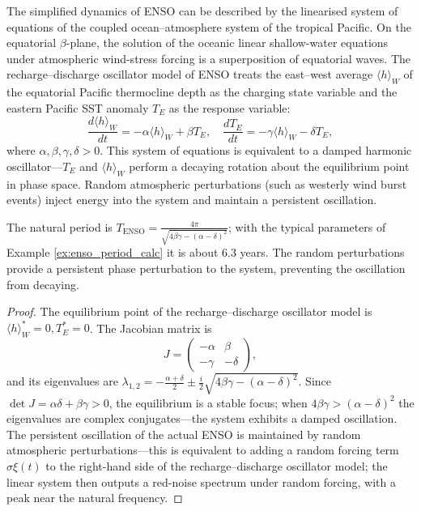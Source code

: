 \begin{proposition}\label{prop:enso_oscillator}
The simplified dynamics of ENSO can be described by the linearised system of equations of the coupled ocean--atmosphere system of the tropical Pacific. On the equatorial $\beta$-plane, the solution of the oceanic linear shallow-water equations under atmospheric wind-stress forcing is a superposition of equatorial waves. The recharge--discharge oscillator model of ENSO treats the east--west average $\langle h \rangle_W$ of the equatorial Pacific thermocline depth as the charging state variable and the eastern Pacific SST anomaly $T_E$ as the response variable:
\[
\frac{d\langle h \rangle_W}{dt} = -\alpha \langle h \rangle_W + \beta T_E, \quad \frac{dT_E}{dt} = -\gamma \langle h \rangle_W - \delta T_E,
\]
where $\alpha, \beta, \gamma, \delta > 0$. This system of equations is equivalent to a damped harmonic oscillator---$T_E$ and $\langle h \rangle_W$ perform a decaying rotation about the equilibrium point in phase space. Random atmospheric perturbations (such as westerly wind burst events) inject energy into the system and maintain a persistent oscillation.

The natural period is $T_{\text{ENSO}} = \frac{4\pi}{\sqrt{4\beta\gamma - (\alpha-\delta)^2}}$; with the typical parameters of Example \ref{ex:enso_period_calc} it is about $6.3$ years. The random perturbations provide a persistent phase perturbation to the system, preventing the oscillation from decaying.
\end{proposition}

\begin{proof}
The equilibrium point of the recharge--discharge oscillator model is $\langle h \rangle_W^* = 0, T_E^* = 0$. The Jacobian matrix is
\[
J = \begin{pmatrix} -\alpha & \beta \\ -\gamma & -\delta \end{pmatrix},
\]
and its eigenvalues are $\lambda_{1,2} = -\frac{\alpha+\delta}{2} \pm \frac{i}{2}\sqrt{4\beta\gamma - (\alpha-\delta)^2}$. Since $\det J = \alpha\delta + \beta\gamma > 0$, the equilibrium is a stable focus; when $4\beta\gamma > (\alpha-\delta)^2$ the eigenvalues are complex conjugates---the system exhibits a damped oscillation. The persistent oscillation of the actual ENSO is maintained by random atmospheric perturbations---this is equivalent to adding a random forcing term $\sigma \xi(t)$ to the right-hand side of the recharge--discharge oscillator model; the linear system then outputs a red-noise spectrum under random forcing, with a peak near the natural frequency.
\end{proof}

